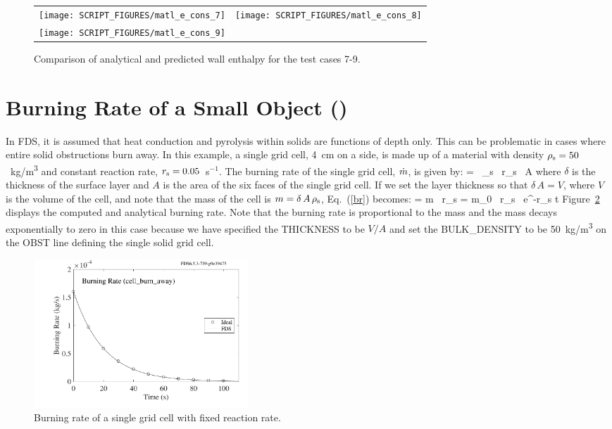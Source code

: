 \documentclass[11pt]{book}
\begin{document}
\begin{figure}[p]
   \noindent
   \begin{tabular*}{\textwidth}{l@{\extracolsep{\fill}}r}
      \texttt{[image: SCRIPT\_FIGURES/matl\_e\_cons\_7]} &
      \texttt{[image: SCRIPT\_FIGURES/matl\_e\_cons\_8]} \\
      \texttt{[image: SCRIPT\_FIGURES/matl\_e\_cons\_9]}
   \end{tabular*}
   \caption[The  test cases 7-9]{Comparison of analytical and predicted wall enthalpy for the  test cases 7-9.}
   \label{fig:matl_e_cons2}
\end{figure}

\section{Burning Rate of a Small Object (\texorpdfstring{}{cell\_burn\_away})}
\label{cell_burn_away}

In FDS, it is assumed that heat conduction and pyrolysis within solids are functions of depth only. This can be problematic in cases where entire solid obstructions burn away. In this example, a single grid cell, 4~cm on a side, is made up of a material with density $\rho_{\rm s}=50$~\si{kg/m^3} and constant reaction rate, $r_{\rm s}=0.05$~s$^{-1}$. The burning rate of the single grid cell, $\dot{m}$, is given by:
\be
   \dm = \delta \, \rho_{\rm s} \, r_{\rm s} \, A  \label{br}
\ee
where $\delta$ is the thickness of the surface layer and $A$ is the area of the six faces of the single grid cell. If we set the layer thickness so that $\delta \, A=V$, where $V$ is the volume of the cell, and note that the mass of the cell is $m=\delta \, A \, \rho_{\rm s}$, Eq.~(\ref{br}) becomes:
\be
   \dm = m \, r_{\rm s} = m_0 \, r_{\rm s} \, {\rm e}^{-r_{\rm s} t}
\ee
Figure~\ref{cell_burn_away_fig} displays the computed and analytical burning rate. Note that the burning rate is proportional to the mass and the mass decays exponentially to zero in this case because we have specified the {\ct THICKNESS} to be $V/A$ and set the {\ct BULK\_DENSITY} to be 50~\si{kg/m^3} on the {\ct OBST} line defining the single solid grid cell.
\begin{figure}[!htb]
\centering
\includegraphics[height=2.2in]{SCRIPT_FIGURES/cell_burn_away}
\caption[The {\ct cell\_burn\_away} test case]{Burning rate of a single grid cell with fixed reaction rate.}
\label{cell_burn_away_fig}
\end{figure}
\end{document}
